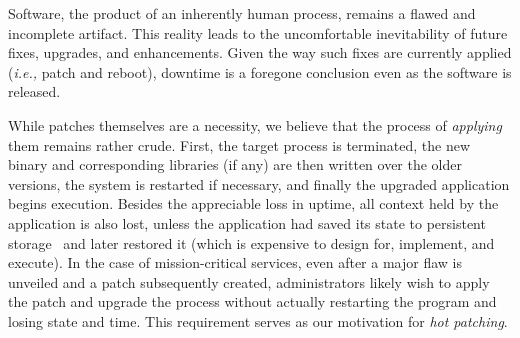 %

Software, the product of an inherently human process, remains a flawed
and incomplete artifact.  This reality leads to the uncomfortable
inevitability of future fixes, upgrades, and enhancements.  Given the
way such fixes are currently applied ({\it i.e.,} patch and reboot),
downtime is a foregone conclusion even as the software is released.



While patches themselves are a necessity, we believe that the process
of {\it applying} them remains rather crude.  First, the target
process is terminated, the new binary and corresponding libraries (if
any) are then written over the older versions, the system is restarted
if necessary, and finally the upgraded application begins execution.
Besides the appreciable loss in uptime, all context held by the
application is also lost, unless the application had saved its
state to persistent storage~\cite{crashonly,brown02rewind} and
later restored it (which
is expensive to design for, implement, and execute).  In the case of
mission-critical services, even after a major flaw is unveiled and a
patch subsequently created, administrators likely wish to apply the
patch and upgrade the process without actually restarting the program
and losing state and time.  This requirement serves as our
motivation for {\it hot patching}.

